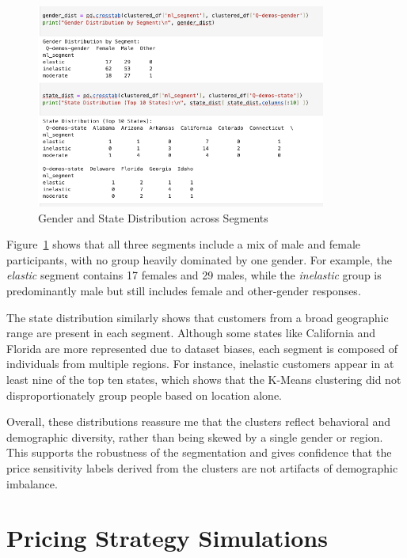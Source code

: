 \documentclass[12pt]{article}
\begin{document}
\begin{figure}[h!]
  \centering
  \includegraphics[width=0.85\textwidth]{gender and state dist by segment.png}
  \caption{Gender and State Distribution across Segments}
  \label{fig:gender-state}
\end{figure}

Figure~\ref{fig:gender-state} shows that all three segments include a mix of male and female participants, with no group heavily dominated by one gender. For example, the \textit{elastic} segment contains 17 females and 29 males, while the \textit{inelastic} group is predominantly male but still includes female and other-gender responses.

The state distribution similarly shows that customers from a broad geographic range are present in each segment. Although some states like California and Florida are more represented due to dataset biases, each segment is composed of individuals from multiple regions. For instance, inelastic customers appear in at least nine of the top ten states, which shows that the K-Means clustering did not disproportionately group people based on location alone.

Overall, these distributions reassure me that the clusters reflect behavioral and demographic diversity, rather than being skewed by a single gender or region. This supports the robustness of the segmentation and gives confidence that the price sensitivity labels derived from the clusters are not artifacts of demographic imbalance.



\section{Pricing Strategy Simulations}
\end{document}
